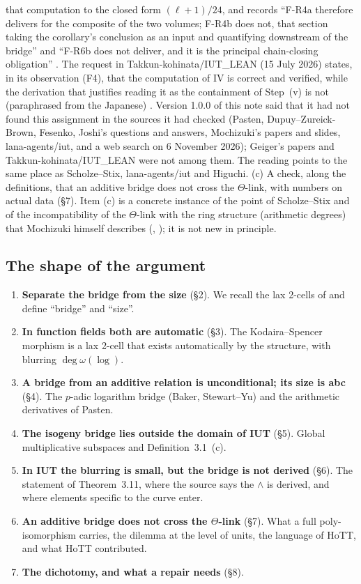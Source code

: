 \documentclass[11pt,a4paper]{article}
\numberwithin{table}{section}
\newcommand{\q}[1]{``#1''}
\theoremstyle{plain}
\theoremstyle{definition}
\begin{document}
\begin{itemize}
{that computation to the closed form $(\ell+1)/24$}, and records \q{F-R4a therefore delivers for the composite of the two
volumes; F-R4b does not, that section taking the corollary's conclusion as an input and quantifying downstream of the
bridge} and \q{F-R6b does not deliver, and it is the principal chain-closing obligation} \cite[\S6.2]{Ge2}. The request
in Takkun-kohinata/IUT\_LEAN (15 July 2026) states, in its observation (F4), that the computation of IV is correct and
verified, while the derivation that justifies reading it as the containment of Step~(v) is not (paraphrased from the
Japanese) \cite{TK}. Version
1.0.0 of this note said that it had not found this assignment in the sources it had checked (Pasten,
Dupuy--Zureick-Brown, Fesenko, Joshi's questions and answers, Mochizuki's papers and slides, lana-agents/iut, and a web
search on 6 November 2026); Geiger's papers and Takkun-kohinata/IUT\_LEAN were not among them. The reading points to the
same place as Scholze--Stix, lana-agents/iut and Higuchi. (c) A check, along the definitions, that an additive
bridge does not cross the $\Theta$-link, with numbers on actual data (\S7). Item (c) is a concrete instance of the
point of Scholze--Stix and of the incompatibility of the $\Theta$-link with the ring structure (arithmetic degrees)
that Mochizuki himself describes (\cite[\S14, (LbEx1)]{R18}, \cite[\S3.3, (iv)]{Alien}); it is not new in principle.
\end{itemize}

\subsection{The shape of the argument}
\begin{enumerate}
\item \textbf{Separate the bridge from the size} (\S2). We recall the lax 2-cells of \cite{SL} and define ``bridge'' and
``size''.
\item \textbf{In function fields both are automatic} (\S3). The Kodaira--Spencer morphism is a lax 2-cell that exists
automatically by the structure, with blurring $\deg\omega(\log)$.
\item \textbf{A bridge from an additive relation is unconditional; its size is abc} (\S4). The $p$-adic logarithm
bridge (Baker, Stewart--Yu) and the arithmetic derivatives of Pasten.
\item \textbf{The isogeny bridge lies outside the domain of IUT} (\S5). Global multiplicative subspaces and
Definition~3.1~(c).
\item \textbf{In IUT the blurring is small, but the bridge is not derived} (\S6). The statement of Theorem~3.11, where
the source says the $\wedge$ is
derived, and where elements specific to the curve enter.
\item \textbf{An additive bridge does not cross the $\Theta$-link} (\S7). What a full poly-isomorphism carries, the
dilemma at the level of units, the language of HoTT, and what HoTT contributed.
\item \textbf{The dichotomy, and what a repair needs} (\S8).
\end{enumerate}
\end{document}
